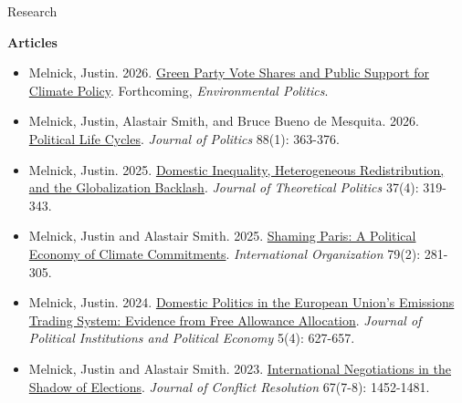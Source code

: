\documentclass{resume} %
\begin{document}
\begin{rSection}{Research}

\textbf{Articles}
\begin{itemize}
   \item Melnick, Justin. 2026. \href{https://justinmelnick.github.io/papers/greens/paper.pdf}{Green Party Vote Shares and Public Support for Climate Policy}. Forthcoming, \textit{Environmental Politics}.

 \item Melnick, Justin, Alastair Smith, and Bruce Bueno de Mesquita. 2026. \href{https://justinmelnick.github.io/papers/plc/paper.pdf}{Political Life Cycles}.  \textit{Journal of Politics} 88(1): 363-376.
           \item Melnick, Justin. 2025. \href{https://justinmelnick.github.io/papers/exit/paper.pdf}{Domestic Inequality, Heterogeneous Redistribution, and the Globalization Backlash}.  \textit{Journal of Theoretical Politics} 37(4): 319-343.
            \item Melnick, Justin and Alastair Smith. 2025. \href{https://justinmelnick.github.io/papers/paris/paper.pdf}{Shaming Paris: A Political Economy of Climate Commitments}. \textit{International Organization} 79(2): 281-305.
\item Melnick, Justin. 2024. \href{https://justinmelnick.github.io/papers/ets/paper.pdf}{Domestic Politics in the European Union’s Emissions Trading System: Evidence from Free Allowance Allocation}. \textit{Journal of Political Institutions and Political Economy} 5(4): 627-657.
    \item Melnick, Justin and Alastair Smith. 2023. \href{https://justinmelnick.github.io/papers/nego/paper.pdf}{International Negotiations in the Shadow of Elections}.  \textit{Journal of Conflict Resolution} 67(7-8): 1452-1481.
\end{itemize}

\smallskip


\end{rSection}
\end{document}
